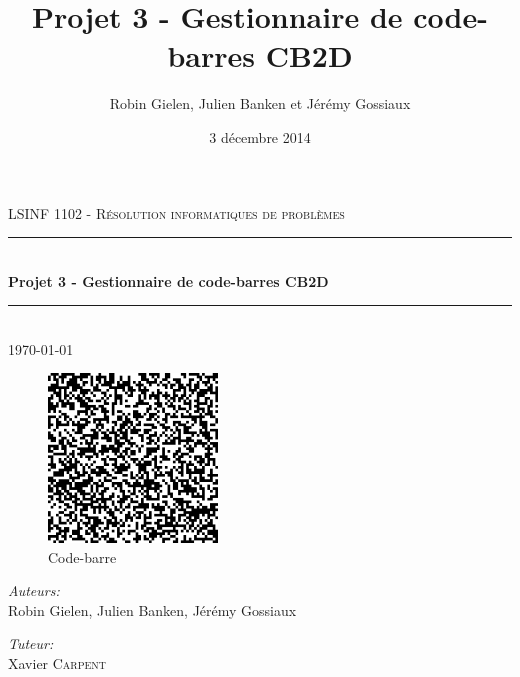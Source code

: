 \documentclass[10pt]{article}
\title{Projet 3 - Gestionnaire de code-barres CB2D}
\date{3 décembre 2014}
\author{Robin Gielen, Julien Banken et Jérémy Gossiaux}
\newcommand{\HRule}{\rule{\linewidth}{0.5mm}}
\begin{document}
\begin{titlepage}
\begin{center}


\textsc{\Large LSINF 1102 - Résolution informatiques de problèmes}\\[0.5cm]

\HRule \\[0.4cm]
{ \huge \bfseries Projet 3 - Gestionnaire de code-barres CB2D \\[0.4cm] }

\HRule \\[1.5cm]

{\large \today}

\vfill


\begin{figure}[!h]
	\centering
	\includegraphics[width=0.4\textwidth]{images/barcode.png}
	\caption{Code-barre}  
	\label{Code-barre}
\end{figure}


\noindent
\begin{minipage}{0.4\textwidth}
\begin{flushleft} \large 
\emph{Auteurs:}\\
Robin Gielen, Julien Banken, Jérémy Gossiaux \textsc{} 
\end{flushleft}
\end{minipage}%
\begin{minipage}{0.4\textwidth}
\begin{flushright} \large
\emph{Tuteur:} \\
Xavier \textsc{Carpent}
\end{flushright}
\end{minipage}



\end{center}
\end{titlepage}

\tableofcontents










\end{document}

